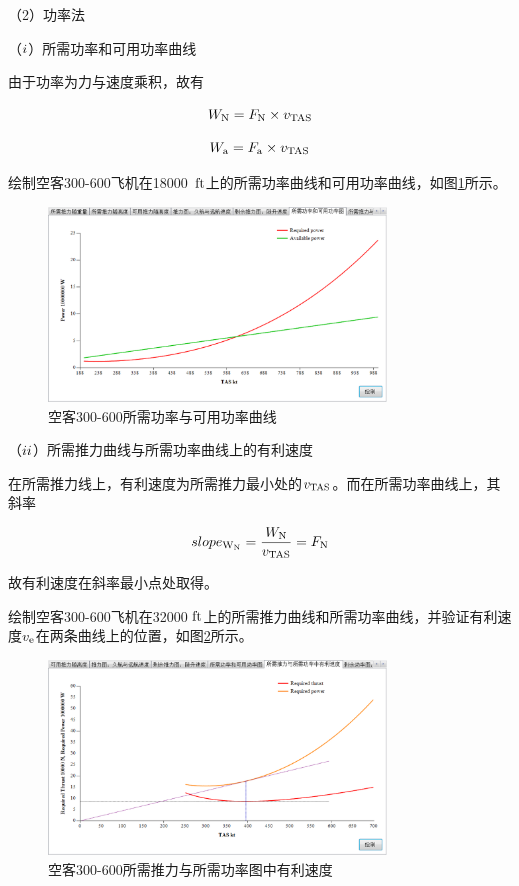 \documentclass[a4paper,punct,space,heading=true,AutoFakeBold]{ctexrep}
\begin{document}
（2）功率法

（$\romannumeral1$）所需功率和可用功率曲线

由于功率为力与速度乘积，故有

\begin{equation}
W_{\rm N}=F_{\rm N}\times v_{\rm TAS}
\end{equation}

\begin{equation}
W_{\rm a}=F_{\rm a}\times v_{\rm TAS}
\end{equation}

绘制空客300-600飞机在18000\ $\rm ft$上的所需功率曲线和可用功率曲线，如图\ref{WRandWa}所示。

\begin{figure}[h]
	\centering
	\includegraphics[width=0.8\textwidth]{pic/WRandWa.eps}\hspace{30pt}
	\caption{空客300-600所需功率与可用功率曲线}\label{WRandWa}
\end{figure}


（$\romannumeral2$）所需推力曲线与所需功率曲线上的有利速度

在所需推力线上，有利速度为所需推力最小处的$v_{\rm TAS}$。而在所需功率曲线上，其斜率

\begin{equation}
slope_{\rm W_{\rm N}}=\frac{W_{\rm N}}{v_{\rm TAS}}=F_{\rm N}
\end{equation}

故有利速度在斜率最小点处取得。

绘制空客300-600飞机在32000 $\rm ft$上的所需推力曲线和所需功率曲线，并验证有利速度$v_{\rm e}$在两条曲线上的位置，如图\ref{veinFRandWR}所示。

\begin{figure}[h]
	\centering
	\includegraphics[width=0.8\textwidth]{pic/veinFRandWR.eps}\hspace{30pt}
	\caption{空客300-600所需推力与所需功率图中有利速度}\label{veinFRandWR}
\end{figure}
\end{document}
